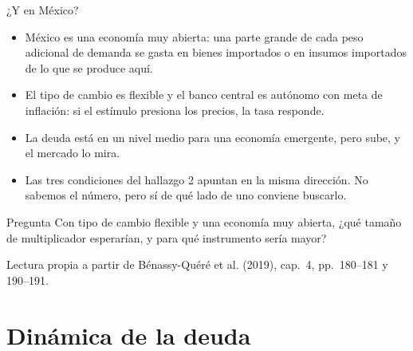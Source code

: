 \documentclass[aspectratio=169,11pt]{beamer}
\newcommand{\fuente}[1]{\par\vfill{\small\color{cGris}#1\par}}
\newcommand{\BQ}{Bénassy-Quéré et al. (2019), cap.~4}
\begin{document}
\begin{frame}{¿Y en México?}
  \begin{itemize}
    \item México es una economía muy abierta: una parte grande de cada peso adicional de demanda se gasta en bienes importados o en insumos importados de lo que se produce aquí.
    \item El tipo de cambio es flexible y el banco central es autónomo con meta de inflación: si el estímulo presiona los precios, la tasa responde.
    \item La deuda está en un nivel medio para una economía emergente, pero sube, y el mercado lo mira.
  \end{itemize}
  \pause
  \begin{itemize}
    \item Las tres condiciones del hallazgo 2 apuntan en la misma dirección. No sabemos el número, pero sí de qué lado de uno conviene buscarlo.
  \end{itemize}
  \pause
  \begin{alertblock}{Pregunta}
    Con tipo de cambio flexible y una economía muy abierta, ¿qué tamaño de multiplicador esperarían, y para qué instrumento sería mayor?
  \end{alertblock}
  \fuente{Lectura propia a partir de \BQ, pp.~180--181 y 190--191.}
\end{frame}

\section{Dinámica de la deuda}
\end{document}
